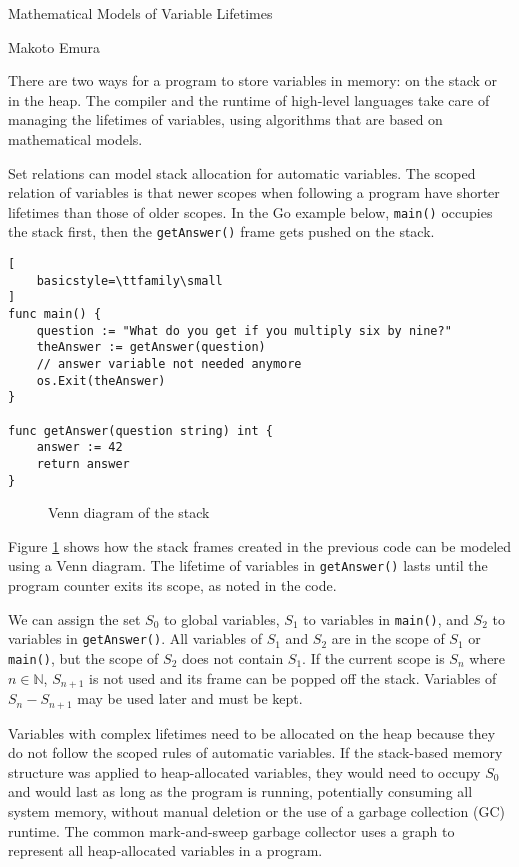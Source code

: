 \documentclass[11pt, letterpaper]{report}
\begin{document}
Mathematical Models of Variable Lifetimes

Makoto Emura

There are two ways for a program to store variables in memory: on the stack or in the heap. The compiler and the runtime of high-level languages take care of managing the lifetimes of variables, using algorithms that are based on mathematical models.

Set relations can model stack allocation for automatic variables. The scoped relation of variables is that newer scopes when following a program have shorter lifetimes than those of older scopes. In the Go example below, \lstinline{main()} occupies the stack first, then the \lstinline{getAnswer()} frame gets pushed on the stack.

\begin{lstlisting}[
    basicstyle=\ttfamily\small
]
func main() {
	question := "What do you get if you multiply six by nine?"
	theAnswer := getAnswer(question)
	// answer variable not needed anymore
	os.Exit(theAnswer)
}

func getAnswer(question string) int {
	answer := 42
	return answer
}
\end{lstlisting}

\begin{wrapfigure}{r}{0.25\textwidth}
    \begin{center}
        
        \caption{Venn diagram of the stack}
        \label{venn_diagram}
    \end{center}
\end{wrapfigure}

Figure \ref{venn_diagram} shows how the stack frames created in the previous code can be modeled using a Venn diagram. The lifetime of variables in \lstinline{getAnswer()} lasts until the program counter exits its scope, as noted in the code.

We can assign the set $S_0$ to global variables, $S_1$ to variables in \lstinline{main()}, and $S_2$ to variables in \lstinline{getAnswer()}. All variables of $S_1$ and $S_2$ are in the scope of $S_1$ or \lstinline{main()}, but the scope of $S_2$ does not contain $S_1$. If the current scope is $S_n$ where $n \in \mathbb{N}$, $S_{n+1}$ is not used and its frame can be popped off the stack. Variables of $S_n - S_{n+1}$ may be used later and must be kept.

Variables with complex lifetimes need to be allocated on the heap because they do not follow the scoped rules of automatic variables. If the stack-based memory structure was applied to heap-allocated variables, they would need to occupy $S_0$ and would last as long as the program is running, potentially consuming all system memory, without manual deletion or the use of a garbage collection (GC) runtime. The common mark-and-sweep garbage collector uses a graph to represent all heap-allocated variables in a program.
\end{document}
